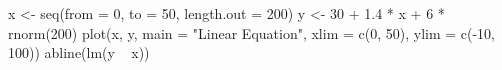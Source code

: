 \begin{Schunk}
\begin{Sinput}
 x <- seq(from = 0, to = 50, length.out = 200)
 y <- 30 + 1.4 * x + 6 * rnorm(200)
 plot(x, y, main = "Linear Equation", xlim = c(0, 50), ylim = c(-10, 100))
 abline(lm(y ~ x))
\end{Sinput}
\end{Schunk}
